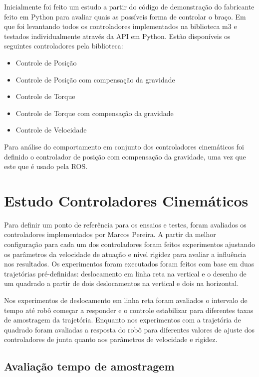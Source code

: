 Inicialmente foi feito um estudo a partir do código de demonstração do fabricante feito em Python para avaliar quais as possíveis forma de controlar o braço. Em que foi levantando todos os controladores implementados na biblioteca m3 e testados individualmente através da API em Python. Estão disponíveis os seguintes controladores pela biblioteca:

\begin{itemize}
    \item Controle de Posição
    \item Controle de Posição com compensação da gravidade
    \item Controle de Torque
    \item Controle de Torque com compensação da gravidade
    \item Controle de Velocidade
\end{itemize}


Para análise do comportamento em conjunto dos controladores cinemáticos foi definido o controlador de posição com compensação da gravidade, uma vez que este que é usado pela ROS.

\section{Estudo Controladores Cinemáticos}

Para definir um ponto de referência para os ensaios e testes, foram avaliados os controladores implementados por Marcos Pereira. A partir da melhor configuração para cada um dos controladores foram feitos experimentos ajustando os parâmetros da velocidade de atuação e nível rigidez para avaliar a influência nos resultados. Os experimentos foram executados foram feitos com base em duas trajetórias pré-definidas: deslocamento em linha reta na vertical e o desenho de um quadrado a partir de dois deslocamentos na vertical e dois na horizontal.

Nos experimentos de deslocamento em linha reta foram avaliados o intervalo de tempo até robô começar a responder e o controle estabilizar para diferentes taxas de amostragem da trajetória. Enquanto nos experimentos com a trajetória de quadrado foram avaliadas a resposta do robô para diferentes valores de ajuste dos controladores de junta quanto aos parâmetros de velocidade e rigidez.

\subsection{Avaliação tempo de amostragem}

